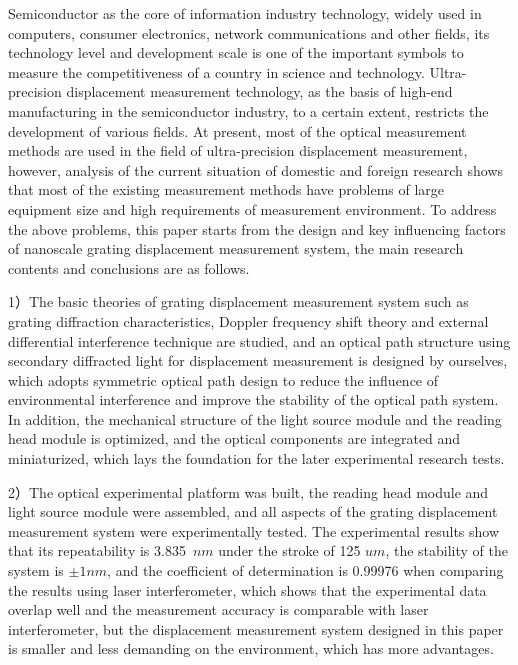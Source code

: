 \documentclass[type=master,oneside]{fduthesis}
\begin{document}
\begin{abstract*}
  Semiconductor as the core of information industry technology, widely used in computers, consumer electronics, network communications and other fields, its technology level and development scale is one of the important symbols to measure the competitiveness of a country in science and technology. Ultra-precision displacement measurement technology, as the basis of high-end manufacturing in the semiconductor industry, to a certain extent, restricts the development of various fields. At present, most of the optical measurement methods are used in the field of ultra-precision displacement measurement, however, analysis of the current situation of domestic and foreign research shows that most of the existing measurement methods have problems of large equipment size and high requirements of measurement environment. To address the above problems, this paper starts from the design and key influencing factors of nanoscale grating displacement measurement system, the main research contents and conclusions are as follows.

  1）The basic theories of grating displacement measurement system such as grating diffraction characteristics, Doppler frequency shift theory and external differential interference technique are studied, and an optical path structure using secondary diffracted light for displacement measurement is designed by ourselves, which adopts symmetric optical path design to reduce the influence of environmental interference and improve the stability of the optical path system. In addition, the mechanical structure of the light source module and the reading head module is optimized, and the optical components are integrated and miniaturized, which lays the foundation for the later experimental research tests.

  2）The optical experimental platform was built, the reading head module and light source module were assembled, and all aspects of the grating displacement measurement system were experimentally tested. The experimental results show that its repeatability is 3.835 $nm$ under the stroke of 125 $um$, the stability of the system is $\pm 1nm$, and the coefficient of determination is 0.99976 when comparing the results using laser interferometer, which shows that the experimental data overlap well and the measurement accuracy is comparable with laser interferometer, but the displacement measurement system designed in this paper is smaller and less demanding on the environment, which has more advantages.


\end{abstract*}
\end{document}
